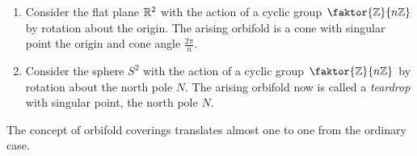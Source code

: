 \begin{example}
    \begin{enumerate}
        \item Consider the flat plane \(\mathbb{R}^2\) with the action of a cyclic group \(\faktor{\Z}{n\Z}\) by rotation about the origin.
            The arising orbifold is a cone with singular point the origin and cone angle \(\frac{2\pi}{n}\).
        
        \item Consider the sphere \(S^2\) with the action of a cyclic group \(\faktor{\Z}{n\Z}\) by rotation about the north pole \(N\).
            The arising orbifold now is called a \emph{teardrop} with singular point, the north pole \(N\).
    \end{enumerate}

    \begin{figure}[ht!]
        \label{fig:orbifolds}
        \centering
        \hspace*{3cm}
    \end{figure}
\end{example}

The concept of orbifold coverings translates almost one to one from the ordinary case.

